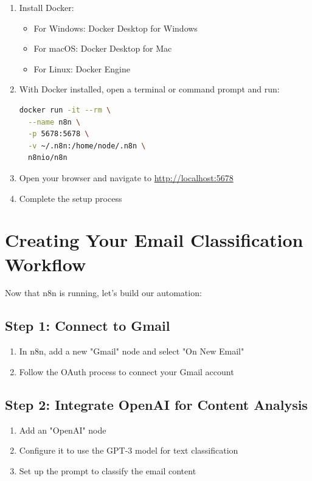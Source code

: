 \begin{enumerate}
    \item Install Docker:
    \begin{itemize}
        \item For Windows: Docker Desktop for Windows
        \item For macOS: Docker Desktop for Mac
        \item For Linux: Docker Engine
    \end{itemize}
    \item With Docker installed, open a terminal or command prompt and run:
    \begin{lstlisting}[language=bash, label={lst:n8n-docker-run}]
docker run -it --rm \
  --name n8n \
  -p 5678:5678 \
  -v ~/.n8n:/home/node/.n8n \
  n8nio/n8n
    \end{lstlisting}
    \item Open your browser and navigate to \url{http://localhost:5678}
    \item Complete the setup process
\end{enumerate}



\section{Creating Your Email Classification Workflow}

Now that n8n is running, let's build our automation:

\subsection{Step 1: Connect to Gmail}

\begin{enumerate}
    \item In n8n, add a new "Gmail" node and select "On New Email"
    \item Follow the OAuth process to connect your Gmail account
\end{enumerate}


\subsection{Step 2: Integrate OpenAI for Content Analysis}

\begin{enumerate}
    \item Add an "OpenAI" node
    \item Configure it to use the GPT-3 model for text classification
    \item Set up the prompt to classify the email content
\end{enumerate}

